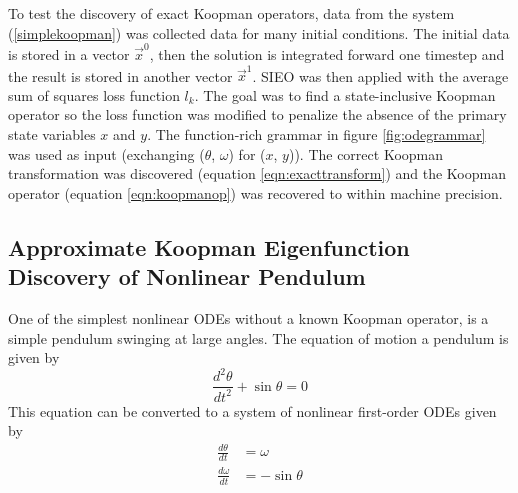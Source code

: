 \documentclass{article}
\begin{document}
To test the discovery of exact Koopman operators, data from the system (\ref{simplekoopman}) was collected data for many initial conditions. The initial data is stored in a vector $\vec{x}^0$, then the solution is integrated forward one timestep and the result is stored in another vector $\vec{x}^1$. SIEO was then applied with the average sum of squares loss function $l_k$. The goal was to find a state-inclusive Koopman operator so the loss function was modified to penalize the absence of the primary state variables $x$ and $y$. The function-rich grammar in figure \ref{fig:odegrammar} was used as input (exchanging ($\theta$, $\omega$) for ($x$, $y$)). The correct Koopman transformation was discovered (equation \ref{eqn:exacttransform}) and the Koopman operator (equation \ref{eqn:koopmanop}) was recovered to within machine precision.







\subsection{Approximate Koopman Eigenfunction Discovery of Nonlinear Pendulum}
One of the simplest nonlinear ODEs without a known Koopman operator, is a simple pendulum swinging at large angles. The equation of motion a pendulum is given by
\[ \frac{d^2 \theta}{d t^2} + \sin \theta = 0 \]
This equation can be converted to a system of nonlinear first-order ODEs given by
\begin{align*}
\frac{d\theta}{dt} &= \omega \\
\frac{d\omega}{dt} &= -\sin \theta
\end{align*}
\end{document}
